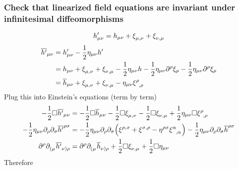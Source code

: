 \subsubsection{Check that linearized field equations are invariant under infinitesimal diffeomorphisms}
\begin{equation}
    h'_{\mu\nu} = h_{\mu\nu} + \tensor{\xi}{_\mu_,_\nu} + \tensor{\xi}{_\nu_,_\mu}
\end{equation}
\begin{equation}
    \begin{split}
        \overline{h'}_{\mu\nu} &= h'_{\mu\nu} - \frac{1}{2} \eta_{\mu\nu}h' \\
        &= h_{\mu\nu} + \tensor{\xi}{_\mu_,_\nu} + \tensor{\xi}{_\nu_,_\mu} - \frac{1}{2} \eta_{\mu\nu}h
        -\frac{1}{2}\eta_{\mu\nu}\partial^\rho\xi_\rho - \frac{1}{2} \eta_{\mu\nu}\partial^\rho\xi_\rho \\
        &= \overline{h}_{\mu\nu} + \tensor{\xi}{_\mu_,_\nu} + \tensor{\xi}{_\nu_,_\mu} - \eta_{\mu\nu}\tensor{\xi}{^\rho_,_\rho}
    \end{split}
\end{equation}
Plug this into Einstein's equations (term by term)
\begin{align}
    -\frac{1}{2}\Box \overline{h'}_{\mu\nu} &= -\frac{1}{2}\Box\overline{h}_{\mu\nu} - \frac{1}{2}\Box\tensor{\xi}{_\mu_,_\nu}
    -\frac{1}{2}\Box\tensor{\xi}{_\nu_,_\mu} + \frac{1}{2} \eta_{\mu\nu}\Box\tensor{\xi}{^\rho_,_\rho} \\
    -\frac{1}{2} \eta_{\mu\nu}\partial_\rho\partial_\sigma \overline{h'}^{\rho\sigma} &= 
    -\frac{1}{2} \eta_{\mu\nu}\partial_\rho\partial_\sigma \left( \tensor{\xi}{^\rho^,^\sigma} + \tensor{\xi}{^\sigma^,^\rho} 
    - \eta^{\rho\sigma} \tensor{\xi}{^\alpha_,_\alpha} \right) - \frac{1}{2} \eta_{\mu\nu}\partial_\rho\partial_\sigma \overline{h}^{\rho\sigma} \\
    \partial^\rho \tensor{\partial}{_(_\mu} \tensor{\overline{h'}}{_\nu_)_\rho} &= 
    \partial^\rho \tensor{\partial}{_(_\mu} \tensor{\overline{h}}{_\nu_)_\rho} + \frac{1}{2}\Box\tensor{\xi}{_\nu_,_\mu} 
    + \frac{1}{2}\Box\eta_{\mu\nu}
\end{align}
Therefore
